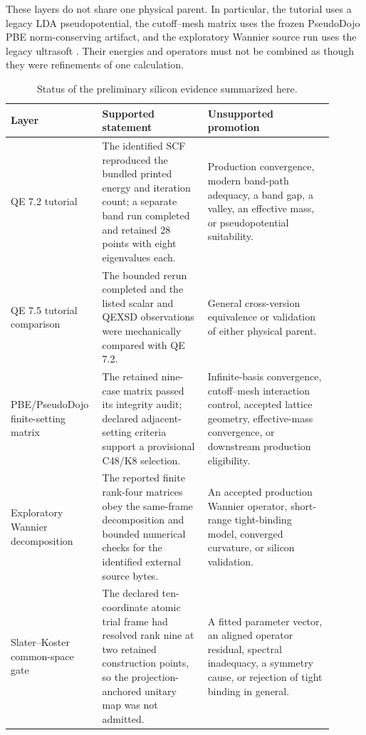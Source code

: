 These layers do not share one physical parent. In particular, the tutorial
uses a legacy LDA pseudopotential, the cutoff--mesh matrix uses the frozen
PseudoDojo PBE norm-conserving artifact, and the exploratory Wannier source run
uses the legacy ultrasoft . Their energies and operators
must not be combined as though they were refinements of one calculation.

\begin{table}[htbp]
  \centering
  \small
  \caption{Status of the preliminary silicon evidence summarized here.}
  \label{tab:preliminary-si-status}
  \begin{tabular}{p{0.22\linewidth}p{0.31\linewidth}p{0.37\linewidth}}
    \toprule
    Layer & Supported statement & Unsupported promotion \\
    \midrule
    QE 7.2 tutorial & The identified SCF reproduced the bundled printed energy
    and iteration count; a separate band run completed and retained 28 points
    with eight eigenvalues each. & Production convergence, modern band-path
    adequacy, a band gap, a valley, an effective mass, or pseudopotential
    suitability. \\
    QE 7.5 tutorial comparison & The bounded rerun completed and the listed
    scalar and QEXSD observations were mechanically compared with QE 7.2. &
    General cross-version equivalence or validation of either physical parent. \\
    PBE/PseudoDojo finite-setting matrix & The retained nine-case matrix passed
    its integrity audit; declared adjacent-setting criteria support a
    provisional C48/K8 selection. & Infinite-basis convergence, cutoff--mesh
    interaction control, accepted lattice geometry, effective-mass convergence,
    or downstream production eligibility. \\
    Exploratory Wannier decomposition & The reported finite rank-four matrices
    obey the same-frame decomposition and bounded numerical checks for the
    identified external source bytes. & An accepted production Wannier operator,
    short-range tight-binding model, converged curvature, or silicon validation. \\
    Slater--Koster common-space gate & The declared ten-coordinate atomic trial
    frame had resolved rank nine at two retained construction points, so the
    projection-anchored unitary map was not admitted. & A fitted parameter
    vector, an aligned operator residual, spectral inadequacy, a symmetry cause,
    or rejection of tight binding in general. \\
    \bottomrule
  \end{tabular}
\end{table}

